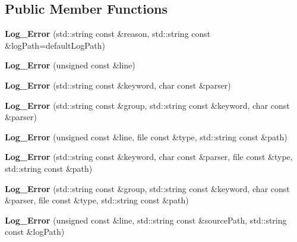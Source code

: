\subsection*{Public Member Functions}
\begin{DoxyCompactItemize}
\item 
\hypertarget{classstb_1_1Log__Error_a7ed6570fac2df3a3bfb789f0bee1958d}{{\bfseries Log\+\_\+\+Error} (std\+::string const \&reason, std\+::string const \&log\+Path=default\+Log\+Path)}\label{classstb_1_1Log__Error_a7ed6570fac2df3a3bfb789f0bee1958d}

\item 
\hypertarget{classstb_1_1Log__Error_a4c44aa1d9ae7be15653601f851390eb1}{{\bfseries Log\+\_\+\+Error} (unsigned const \&line)}\label{classstb_1_1Log__Error_a4c44aa1d9ae7be15653601f851390eb1}

\item 
\hypertarget{classstb_1_1Log__Error_acc91a5062d2f065f3e23f14b3812f73c}{{\bfseries Log\+\_\+\+Error} (std\+::string const \&keyword, char const \&parser)}\label{classstb_1_1Log__Error_acc91a5062d2f065f3e23f14b3812f73c}

\item 
\hypertarget{classstb_1_1Log__Error_ab113ebb64138de08907e8d24d2cbf2a7}{{\bfseries Log\+\_\+\+Error} (std\+::string const \&group, std\+::string const \&keyword, char const \&parser)}\label{classstb_1_1Log__Error_ab113ebb64138de08907e8d24d2cbf2a7}

\item 
\hypertarget{classstb_1_1Log__Error_a45e45d9e7f2ab62f1257c5a53477bc77}{{\bfseries Log\+\_\+\+Error} (unsigned const \&line, file const \&type, std\+::string const \&path)}\label{classstb_1_1Log__Error_a45e45d9e7f2ab62f1257c5a53477bc77}

\item 
\hypertarget{classstb_1_1Log__Error_a047ade62672eb89461f9637d7e28702b}{{\bfseries Log\+\_\+\+Error} (std\+::string const \&keyword, char const \&parser, file const \&type, std\+::string const \&path)}\label{classstb_1_1Log__Error_a047ade62672eb89461f9637d7e28702b}

\item 
\hypertarget{classstb_1_1Log__Error_a6bf19719af36b5508f7620825235127b}{{\bfseries Log\+\_\+\+Error} (std\+::string const \&group, std\+::string const \&keyword, char const \&parser, file const \&type, std\+::string const \&path)}\label{classstb_1_1Log__Error_a6bf19719af36b5508f7620825235127b}

\item 
\hypertarget{classstb_1_1Log__Error_a151a624f9a9d49721d13ecd9325ee222}{{\bfseries Log\+\_\+\+Error} (unsigned const \&line, std\+::string const \&source\+Path, std\+::string const \&log\+Path)}\label{classstb_1_1Log__Error_a151a624f9a9d49721d13ecd9325ee222}


\end{DoxyCompactItemize}
